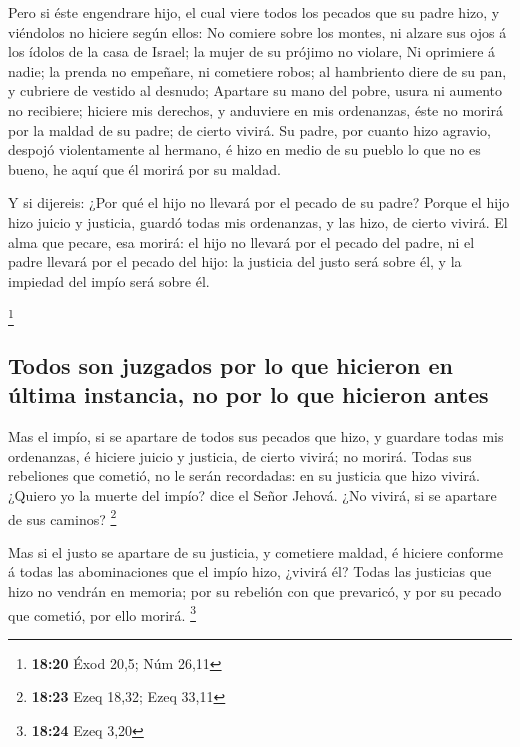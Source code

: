  Pero si éste engendrare hijo, el cual viere todos los
pecados que su padre hizo, y viéndolos no hiciere según ellos:
 No comiere sobre los montes, ni alzare sus ojos á los
ídolos de la casa de Israel; la mujer de su prójimo no violare,
 Ni oprimiere á nadie; la prenda no empeñare, ni
cometiere robos; al hambriento diere de su pan, y cubriere de vestido al
desnudo;  Apartare su mano del pobre, usura ni aumento no
recibiere; hiciere mis derechos, y anduviere en mis ordenanzas, éste no
morirá por la maldad de su padre; de cierto vivirá.  Su
padre, por cuanto hizo agravio, despojó violentamente al hermano, é hizo
en medio de su pueblo lo que no es bueno, he aquí que él morirá por su
maldad.

 Y si dijereis: ¿Por qué el hijo no llevará por el pecado
de su padre? Porque el hijo hizo juicio y justicia, guardó todas mis
ordenanzas, y las hizo, de cierto vivirá.  El alma que
pecare, esa morirá: el hijo no llevará por el pecado del padre, ni el
padre llevará por el pecado del hijo: la justicia del justo será sobre
él, y la impiedad del impío será sobre él.

\footnote{\textbf{18:20} Éxod 20,5; Núm 26,11}

\hypertarget{todos-son-juzgados-por-lo-que-hicieron-en-uxfaltima-instancia-no-por-lo-que-hicieron-antes}{%
\subsection{Todos son juzgados por lo que hicieron en última instancia,
no por lo que hicieron
antes}\label{todos-son-juzgados-por-lo-que-hicieron-en-uxfaltima-instancia-no-por-lo-que-hicieron-antes}}

 Mas el impío, si se apartare de todos sus pecados que
hizo, y guardare todas mis ordenanzas, é hiciere juicio y justicia, de
cierto vivirá; no morirá.  Todas sus rebeliones que
cometió, no le serán recordadas: en su justicia que hizo vivirá.
 ¿Quiero yo la muerte del impío? dice el Señor Jehová.
¿No vivirá, si se apartare de sus caminos? \footnote{\textbf{18:23} Ezeq
  18,32; Ezeq 33,11}

 Mas si el justo se apartare de su justicia, y cometiere
maldad, é hiciere conforme á todas las abominaciones que el impío hizo,
¿vivirá él? Todas las justicias que hizo no vendrán en memoria; por su
rebelión con que prevaricó, y por su pecado que cometió, por ello
morirá. \footnote{\textbf{18:24} Ezeq 3,20}

